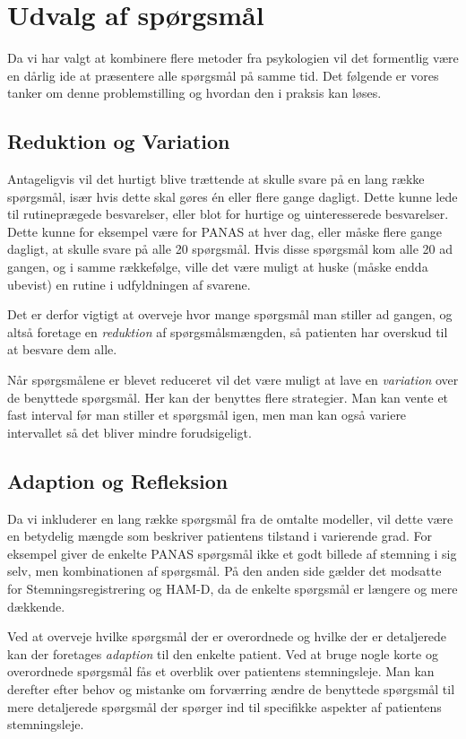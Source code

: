 \section{Udvalg af spørgsmål}
Da vi har valgt at kombinere flere metoder fra psykologien vil det formentlig være en dårlig ide at præsentere alle spørgsmål på samme tid.
Det følgende er vores tanker om denne problemstilling og hvordan den i praksis kan løses.

\subsection{Reduktion og Variation}
Antageligvis vil det hurtigt blive trættende at skulle svare på en lang række spørgsmål, især hvis dette skal gøres én eller flere gange dagligt.
Dette kunne lede til rutineprægede besvarelser, eller blot for hurtige og uinteresserede besvarelser.
Dette kunne for eksempel være for PANAS at hver dag, eller måske flere gange dagligt, at skulle svare på alle 20 spørgsmål.
Hvis disse spørgsmål kom alle 20 ad gangen, og i samme rækkefølge, ville det være muligt at huske (måske endda ubevist) en rutine i udfyldningen af svarene.

Det er derfor vigtigt at overveje hvor mange spørgsmål man stiller ad gangen, og altså foretage en \emph{reduktion} af spørgsmålsmængden, så patienten har overskud til at besvare dem alle.

Når spørgsmålene er blevet reduceret vil det være muligt at lave en \emph{variation} over de benyttede spørgsmål.
Her kan der benyttes flere strategier.
Man kan vente et fast interval før man stiller et spørgsmål igen, men man kan også variere intervallet så det bliver mindre forudsigeligt.

\subsection{Adaption og Refleksion}
Da vi inkluderer en lang række spørgsmål fra de omtalte modeller, vil dette være en betydelig mængde som beskriver patientens tilstand i varierende grad.
For eksempel giver de enkelte PANAS spørgsmål ikke et godt billede af stemning i sig selv, men kombinationen af spørgsmål.
På den anden side gælder det modsatte for Stemningsregistrering og HAM-D, da de enkelte spørgsmål er længere og mere dækkende.

Ved at overveje hvilke spørgsmål der er overordnede og hvilke der er detaljerede kan der foretages \emph{adaption} til den enkelte patient.
Ved at bruge nogle korte og overordnede spørgsmål fås et overblik over patientens stemningsleje.
Man kan derefter efter behov og mistanke om forværring ændre de benyttede spørgsmål til mere detaljerede spørgsmål der spørger ind til specifikke aspekter af patientens stemningsleje.

